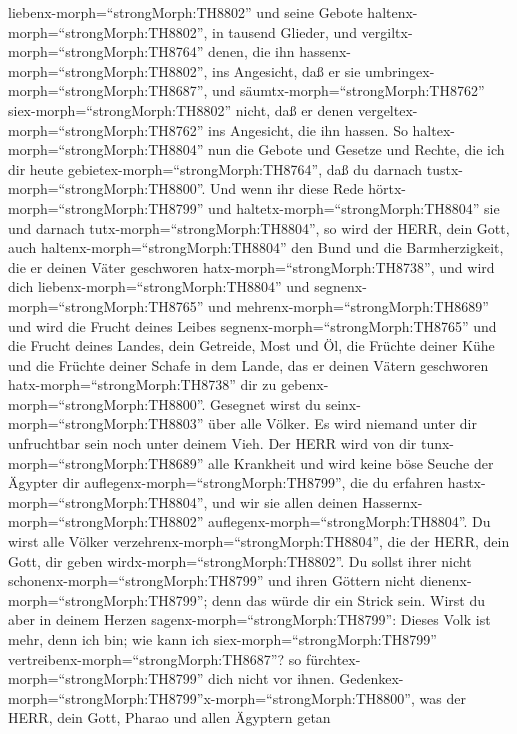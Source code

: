 liebenx-morph=``strongMorph:TH8802'' und seine Gebote
haltenx-morph=``strongMorph:TH8802'', in tausend Glieder, 
und vergiltx-morph=``strongMorph:TH8764'' denen, die ihn
hassenx-morph=``strongMorph:TH8802'', ins Angesicht, daß er sie
umbringex-morph=``strongMorph:TH8687'', und
säumtx-morph=``strongMorph:TH8762'' siex-morph=``strongMorph:TH8802''
nicht, daß er denen vergeltex-morph=``strongMorph:TH8762'' ins
Angesicht, die ihn hassen.  So
haltex-morph=``strongMorph:TH8804'' nun die Gebote und Gesetze und
Rechte, die ich dir heute gebietex-morph=``strongMorph:TH8764'', daß du
darnach tustx-morph=``strongMorph:TH8800''.  Und wenn ihr
diese Rede hörtx-morph=``strongMorph:TH8799'' und
haltetx-morph=``strongMorph:TH8804'' sie und darnach
tutx-morph=``strongMorph:TH8804'', so wird der HERR, dein Gott, auch
haltenx-morph=``strongMorph:TH8804'' den Bund und die Barmherzigkeit,
die er deinen Väter geschworen hatx-morph=``strongMorph:TH8738'',
 und wird dich liebenx-morph=``strongMorph:TH8804'' und
segnenx-morph=``strongMorph:TH8765'' und
mehrenx-morph=``strongMorph:TH8689'' und wird die Frucht deines Leibes
segnenx-morph=``strongMorph:TH8765'' und die Frucht deines Landes, dein
Getreide, Most und Öl, die Früchte deiner Kühe und die Früchte deiner
Schafe in dem Lande, das er deinen Vätern geschworen
hatx-morph=``strongMorph:TH8738'' dir zu
gebenx-morph=``strongMorph:TH8800''.  Gesegnet wirst du
seinx-morph=``strongMorph:TH8803'' über alle Völker. Es wird niemand
unter dir unfruchtbar sein noch unter deinem Vieh.  Der
HERR wird von dir tunx-morph=``strongMorph:TH8689'' alle Krankheit und
wird keine böse Seuche der Ägypter dir
auflegenx-morph=``strongMorph:TH8799'', die du erfahren
hastx-morph=``strongMorph:TH8804'', und wir sie allen deinen
Hassernx-morph=``strongMorph:TH8802''
auflegenx-morph=``strongMorph:TH8804''.  Du wirst alle
Völker verzehrenx-morph=``strongMorph:TH8804'', die der HERR, dein Gott,
dir geben wirdx-morph=``strongMorph:TH8802''. Du sollst ihrer nicht
schonenx-morph=``strongMorph:TH8799'' und ihren Göttern nicht
dienenx-morph=``strongMorph:TH8799''; denn das würde dir ein Strick
sein.  Wirst du aber in deinem Herzen
sagenx-morph=``strongMorph:TH8799'': Dieses Volk ist mehr, denn ich bin;
wie kann ich siex-morph=``strongMorph:TH8799''
vertreibenx-morph=``strongMorph:TH8687''?  so
fürchtex-morph=``strongMorph:TH8799'' dich nicht vor ihnen.
Gedenkex-morph=``strongMorph:TH8799''x-morph=``strongMorph:TH8800'', was
der HERR, dein Gott, Pharao und allen Ägyptern getan
